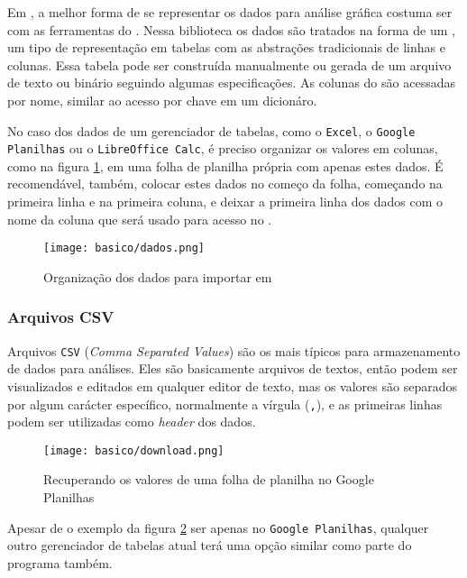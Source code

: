 Em \python, a melhor forma de se representar os dados para análise gráfica costuma ser com as ferramentas do \pandas. Nessa biblioteca os dados são tratados na forma de um \dataframe, um tipo de representação em tabelas com as abstrações tradicionais de linhas e colunas. Essa tabela pode ser construída manualmente ou gerada de um arquivo de texto ou binário seguindo algumas especificações. As colunas do \dataframe são acessadas por nome, similar ao acesso por chave em um dicionáro.

No caso dos dados de um gerenciador de tabelas, como o \texttt{Excel}, o \texttt{Google Planilhas} ou o \texttt{LibreOffice Calc}, é preciso organizar os valores em colunas, como na figura \ref{fig:basico:dados}, em uma folha de planilha própria com apenas estes dados. É recomendável, também, colocar estes dados no começo da folha, começando na primeira linha e na primeira coluna, e deixar a primeira linha dos dados com o nome da coluna que será usado para acesso no \dataframe.

\begin{figure}[H]
    \centering
    \texttt{[image: basico/dados.png]}

    \caption{Organização dos dados para importar em \python}
    \label{fig:basico:dados}
\end{figure}


\subsubsection{Arquivos CSV}

    Arquivos \texttt{CSV} (\textit{Comma Separated Values}) são os mais típicos para armazenamento de dados para análises. Eles são basicamente arquivos de textos, então podem ser visualizados e editados em qualquer editor de texto, mas os valores são separados por algum carácter específico, normalmente a vírgula (\texttt{,}), e as primeiras linhas podem ser utilizadas como \textit{header} dos dados.

    \begin{figure}[H]
        \centering
        \texttt{[image: basico/download.png]}

        \caption{Recuperando os valores de uma folha de planilha no Google Planilhas}
        \label{fig:basico:download}
    \end{figure}

    Apesar de o exemplo da figura \ref{fig:basico:download} ser apenas no \texttt{Google Planilhas}, qualquer outro gerenciador de tabelas atual terá uma opção similar como parte do programa também.


